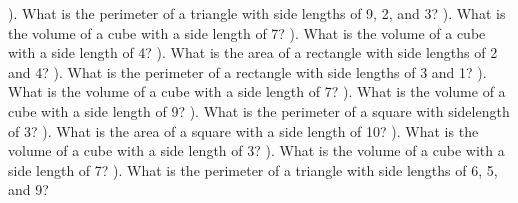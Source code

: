 \documentclass{article}%
\begin{document}
). What is the perimeter of a triangle with side lengths of 9, 2, and 3?%
\newline%
\newline%
). What is the volume of a cube with a side length of 7?%
\newline%
\newline%
). What is the volume of a cube with a side length of 4?%
\newline%
\newline%
). What is the area of a rectangle with side lengths of 2 and 4?%
\newline%
\newline%
). What is the perimeter of a rectangle with side lengths of 3 and 1?%
\newline%
\newline%
). What is the volume of a cube with a side length of 7?%
\newline%
\newline%
). What is the volume of a cube with a side length of 9?%
\newline%
\newline%
). What is the perimeter of a square with sidelength of 3?%
\newline%
\newline%
). What is the area of a square with a side length of 10?%
\newline%
\newline%
). What is the volume of a cube with a side length of 3?%
\newline%
\newline%
). What is the volume of a cube with a side length of 7?%
\newline%
\newline%
). What is the perimeter of a triangle with side lengths of 6, 5, and 9?%
\newline%
\newline%
\newline%
\end{document}
